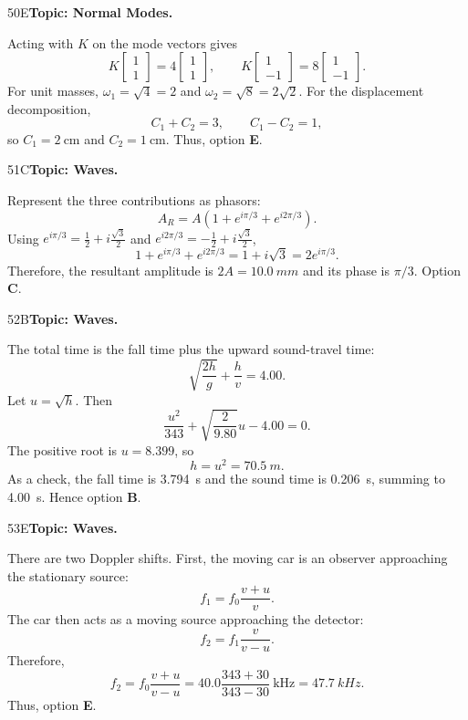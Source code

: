\documentclass[10pt,a4paper]{physicsquiz}
\begin{document}
\begin{workedsolution}{50}{E}\textbf{Topic: Normal Modes.}\par Acting with \(K\) on the mode vectors gives
  \[
    K\begin{bmatrix}1\\1\end{bmatrix}=4\begin{bmatrix}1\\1\end{bmatrix},
    \qquad
    K\begin{bmatrix}1\\-1\end{bmatrix}=8\begin{bmatrix}1\\-1\end{bmatrix}.
  \]
  For unit masses, \(\omega_1=\sqrt4=2\) and \(\omega_2=\sqrt8=2\sqrt2\). For the displacement decomposition,
  \[
    C_1+C_2=3,\qquad C_1-C_2=1,
  \]
  so \(C_1=2\ \mathrm{cm}\) and \(C_2=1\ \mathrm{cm}\). Thus, option \textbf{E}.\end{workedsolution}
\begin{workedsolution}{51}{C}\textbf{Topic: Waves.}\par Represent the three contributions as phasors:
  \[
    A_R=A\left(1+e^{i\pi/3}+e^{i2\pi/3}\right).
  \]
  Using \(e^{i\pi/3}=\tfrac12+i\tfrac{\sqrt3}{2}\) and \(e^{i2\pi/3}=-\tfrac12+i\tfrac{\sqrt3}{2}\),
  \[
    1+e^{i\pi/3}+e^{i2\pi/3}=1+i\sqrt3=2e^{i\pi/3}.
  \]
  Therefore, the resultant amplitude is \(2A=\SI{10.0}{mm}\) and its phase is \(\pi/3\). Option \textbf{C}.\end{workedsolution}
\begin{workedsolution}{52}{B}\textbf{Topic: Waves.}\par The total time is the fall time plus the upward sound-travel time:
  \[
    \sqrt{\frac{2h}{g}}+\frac{h}{v}=4.00.
  \]
  Let \(u=\sqrt{h}\). Then
  \[
    \frac{u^2}{343}+\sqrt{\frac{2}{9.80}}u-4.00=0.
  \]
  The positive root is \(u=8.399\), so
  \[
    h=u^2=\SI{70.5}{m}.
  \]
  As a check, the fall time is \SI{3.794}{s} and the sound time is \SI{0.206}{s}, summing to \SI{4.00}{s}. Hence option \textbf{B}.\end{workedsolution}
\begin{workedsolution}{53}{E}\textbf{Topic: Waves.}\par There are two Doppler shifts. First, the moving car is an observer approaching the stationary source:
  \[
    f_1=f_0\frac{v+u}{v}.
  \]
  The car then acts as a moving source approaching the detector:
  \[
    f_2=f_1\frac{v}{v-u}.
  \]
  Therefore,
  \[
    f_2=f_0\frac{v+u}{v-u}
    =40.0\frac{343+30}{343-30}\ \mathrm{kHz}
    =\SI{47.7}{kHz}.
  \]
  Thus, option \textbf{E}.\end{workedsolution}
\end{document}
